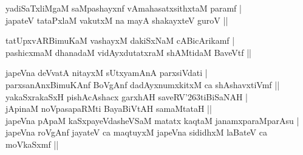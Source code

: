 \begin{entry}
\begin{shl}
yadiSaTxliMgaM saMpashayxnf vAmahasatxsithxtaM paramf |\\
japateV tataPxlaM vakutxM na mayA shakayxteV guroV ||
\end{shl}
\begin{shl}
tatUpxvARBimuKaM vashayxM dakiSxNaM cABicArikamf |\\
pashicxmaM dhanadaM vidAyxdutatxraM shAMtidaM BaveVtf ||
\end{shl}
\begin{shl}
japeVna deVvatA nitayxM sUtxyamAnA parxsiVdati |\\
parxsanAnxBimuKAnf BoVgAnf dadAyxnumxkitxM ca shAshavxtiVmf ||\\
yakaSxrakaSxH pishAcAshacx garxhAH saveRV{\char'263}tiBiSaNAH |\\
jApinaM noVpasapaRMti BayaBiVtAH samaMtataH ||\\
japeVna pApaM kaSxpayeVdasheVSaM matatx kaqtaM janamxparaMparAsu |\\
japeVna roVgAnf jayateV ca maqtuyxM japeVna sididhxM laBateV ca moVkaSxmf ||
\end{shl}
\end{entry}

